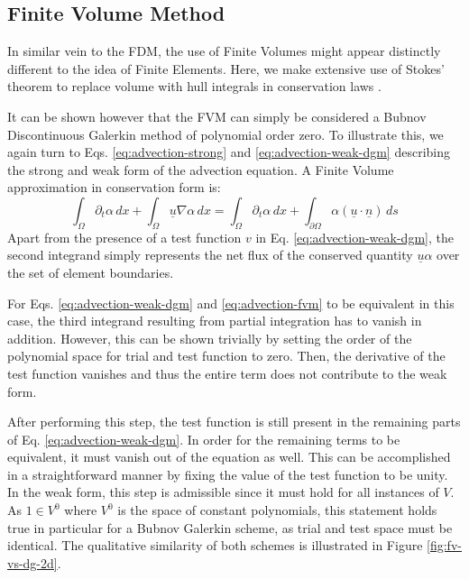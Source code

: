 \documentclass[sn-mathphys,Numbered]{sn-jnl}%
\theoremstyle{thmstyleone}%
\theoremstyle{thmstyletwo}%
\theoremstyle{thmstylethree}%
\begin{document}
\subsection{Finite Volume Method}

In similar vein to the FDM, the use of Finite Volumes might appear distinctly different to the idea of Finite Elements.
Here, we make extensive use of Stokes' theorem to replace volume with hull integrals in conservation laws \cite{eymardFiniteVolumeMethods2000}.

It can be shown however that the FVM can simply be considered a Bubnov Discontinuous Galerkin method of polynomial order zero.
To illustrate this, we again turn to Eqs. \ref{eq:advection-strong} and \ref{eq:advection-weak-dgm} describing the strong and weak form of the advection equation.
A Finite Volume approximation in conservation form is:
\begin{equation}\label{eq:advection-fvm}
    \int_\Omega \partial_t \alpha \,dx + \int_\Omega \underline{u} \nabla \alpha \,dx =  \int_\Omega \partial_t \alpha \,dx + \int_{\partial\Omega} \alpha (\underline{u}\cdot\underline{n}) \,ds
\end{equation}
Apart from the presence of a test function $v$ in Eq. \ref{eq:advection-weak-dgm}, the second integrand simply represents the net flux of the conserved quantity $\underline{u}\alpha$ over the set of element boundaries.

For Eqs. \ref{eq:advection-weak-dgm} and \ref{eq:advection-fvm} to be equivalent in this case, the third integrand resulting from partial integration has to vanish in addition.
However, this can be shown trivially by setting the order of the polynomial space for trial and test function to zero.
Then, the derivative of the test function vanishes and thus the entire term does not contribute to the weak form.

After performing this step, the test function is still present in the remaining parts of Eq. \ref{eq:advection-weak-dgm}.
In order for the remaining terms to be equivalent, it must vanish out of the equation as well.
This can be accomplished in a straightforward manner by fixing the value of the test function to be unity.
In the weak form, this step is admissible since it must hold for all instances of $V$.
As $1 \in V^0$ where $V^0$ is the space of constant polynomials, this statement holds true in particular for a Bubnov Galerkin scheme, as trial and test space must be identical.
The qualitative similarity of both schemes is illustrated in Figure \ref{fig:fv-vs-dg-2d}.
\end{document}
